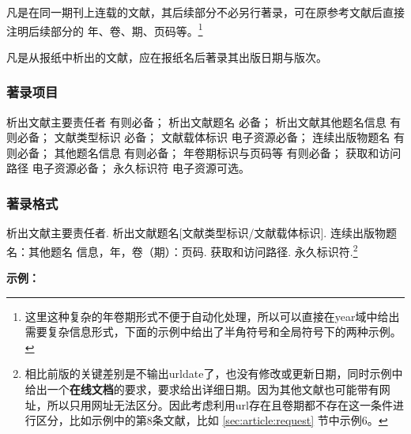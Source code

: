 \documentclass[twoside]{article}%
\begin{document}
凡是在同一期刊上连载的文献，其后续部分不必另行著录，可在原参考文献后直接注明后续部分的
年、卷、期、页码等。\footnote{这里这种复杂的年卷期形式不便于自动化处理，所以可以直接在year域中给出需要复杂信息形式，下面的示例中给出了半角符号和全局符号下的两种示例。}

\begin{refsection}

\nocite{egdatevolnumpagef--,egdatevolnumpagefull--}

{}
\end{refsection}


凡是从报纸中析出的文献，应在报纸名后著录其出版日期与版次。


\begin{refsection}

\nocite{egdatevolnumpagei--}

{}
\end{refsection}


\subsubsection{著录项目}

析出文献主要责任者 有则必备；
析出文献题名 必备；
析出文献其他题名信息 有则必备；
文献类型标识 必备；
文献载体标识 电子资源必备；
连续出版物题名 有则必备；
其他题名信息 有则必备；
年卷期标识与页码等 有则必备；
获取和访问路径 电子资源必备；
永久标识符 电子资源可选。

\subsubsection{著录格式}

析出文献主要责任者. 析出文献题名[文献类型标识/文献载体标识]. 连续出版物题名：其他题名
信息，年，卷（期）：页码. 获取和访问路径. 永久标识符.\footnote{相比前版的关键差别是不输出urldate了，也没有修改或更新日期，同时示例中给出一个\textbf{在线文档}的要求，要求给出详细日期。因为其他文献也可能带有网址，所以只用网址无法区分。因此考虑利用url存在且卷期都不存在这一条件进行区分，比如示例中的第8条文献，比如 \ref{sec:article:request} 节中示例6。}

\begin{refsection}



\nocite{杨洪升2013-56-75}
\nocite{丁文祥2000--}
\nocite{于潇2012-1518-1523}
\nocite{李炳穆2008-6-12}
\nocite{陈建军2010-93-93,陈缮真2022--,李幼平2010-225-228}
\nocite{张群2024在线,
张群2024出版,
Caplan1993-61-66,
Saito2006-169-176,
DESMARAIS1992-605-609,
Park2010-696-715,
Frese2013-378-398,
Myburg2014-356-362,SANTER2025ANN,SHINOTSUKA2023SAMPLE}



\textbf{示例：}

{\printbibliography[heading=none,env=indentegenv]}
\end{refsection}
\end{document}
